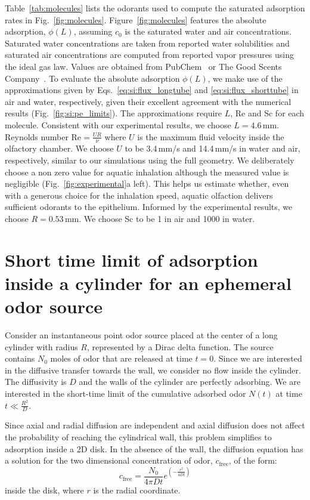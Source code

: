 \documentclass[%
 twocolumn,
 amsmath,amssymb,
 aps,prfluids,
 superscriptaddress,
]{revtex4-2}
\newcommand{\Rey}{\mathrm{Re}}
\begin{document}
Table~\ref{tab:molecules} lists the odorants used to compute the saturated adsorption rates in Fig.~\ref{fig:molecules}. Figure~\ref{fig:molecules} features the absolute adsorption, $\phi(L)$, assuming $c_0$ is the %
saturated water and air concentrations. %
Saturated water concentrations are taken from reported water solubilities and saturated air concentrations are computed from reported vapor pressures using the ideal gas law. Values are obtained from PubChem~\cite{kim2025pubchem} or The Good Scents Company~\cite{goodscents}. To evaluate the absolute adsorption $\phi(L)$, we make use of the approximations given by Eqs.~\eqref{eq:si:flux_longtube} and \eqref{eq:si:flux_shorttube} in air and water, respectively, given their excellent agreement with the numerical results (Fig.~\ref{fig:si:pe_limits}). The approximations require $L$, Re and Sc for each molecule. Consistent with our experimental results, we choose $L = 4.6$\,mm. Reynolds number $\Rey = \frac{UR}{\nu}$ where $U$ is the maximum fluid velocity inside the olfactory chamber. We choose $U$ to be 3.4\,mm/s and 14.4\,mm/s in water and air, respectively, similar to our simulations using the full geometry. We deliberately choose a non zero value for aquatic inhalation although the measured value is negligible (Fig.~\ref{fig:experimental}a left). This helps us estimate whether, even with a generous choice for the inhalation speed, aquatic olfaction delivers sufficient odorants to the epithelium. Informed by the experimental results, we choose $R = 0.53$\,mm. We choose Sc to be 1 in air and 1000 in water.

\section{Short time limit of adsorption inside a cylinder for an ephemeral odor source}
\label{sec:si:short_time_limit}

Consider an instantaneous point odor source placed at the center of a long cylinder with radius $R$, represented by a Dirac delta function. The source contains $N_0$ moles of odor that are released at time $t=0$. Since we are interested in the diffusive transfer towards the wall, we consider no flow inside the cylinder. The diffusivity is $D$ and the walls of the cylinder are perfectly adsorbing. We are interested in the short-time limit of the cumulative
adsorbed odor $N(t)$ at time $t\ll \frac{R^2}{D}$. 

Since axial and radial diffusion are independent and axial diffusion does not affect the probability of reaching the cylindrical wall, this problem simplifies to adsorption inside a 2D disk. In the absence of the wall, the diffusion equation has a solution for the two dimensional concentration of odor, $c_{\mathrm{free}} $,  of the form:
\begin{equation}
    c_{\mathrm{free}} = \frac{N_0}{4\pi Dt}e^{\left( -\frac{r^2}{4Dt} \right)}
\end{equation}
inside the disk, where $r$ is the radial coordinate. 
\end{document}
